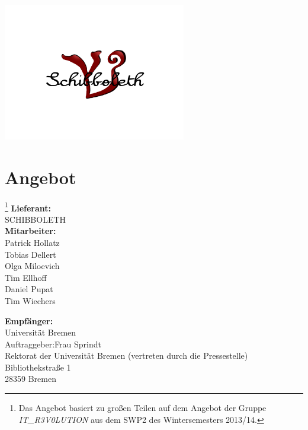 \documentclass[fontsize=12pt,paper=a4,twoside]{scrartcl}
\begin{document}
\begin{center}
\includegraphics[width=0.6\textwidth]{Bilder/Logo.png}
\end{center}

\section*{Angebot}\footnote{Das Angebot basiert zu großen Teilen auf dem Angebot der Gruppe \textit{IT\_R3V0LUTION} aus dem SWP2 des Wintersemesters 2013/14.}
\textbf{Lieferant:}\\
SCHIBBOLETH\\


\textbf{Mitarbeiter:}\\
Patrick Hollatz\\
Tobias Dellert\\
Olga Miloevich\\
Tim Ellhoff\\
Daniel Pupat\\
Tim Wiechers

\textbf{Empfänger:}\\
Universität Bremen\\
Auftraggeber:Frau Sprindt\\
Rektorat der Universität Bremen
(vertreten durch die Pressestelle)\\
Bibliothekstraße 1\\
28359 Bremen
\end{document}
